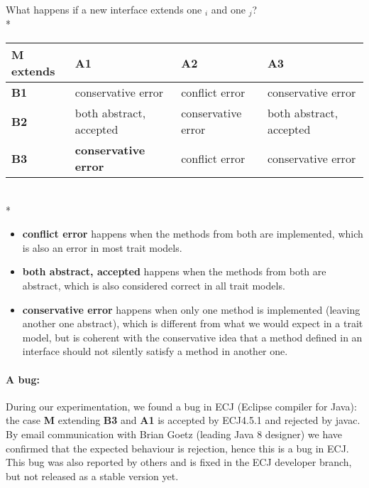 \noindent
What happens if a new interface \Q@M@ extends one \Q@A@${}_i$ and one
\Q@B@${}_j$?\\*
\noindent
\begin{tabular}{|l|l|l|l|}
\hline
\textbf{M extends} & \textbf{A1}                  & \textbf{A2} & \textbf{A3} \\ \hline
\textbf{B1}        & conservative error                        & conflict error      & conservative error       \\ \hline
\textbf{B2}        & both abstract, accepted                        & conservative error       & both abstract, accepted       \\ \hline
\textbf{B3}        & \textbf{conservative error} &conflict  error       & conservative error      \\ \hline
\end{tabular}
\\*
\begin{itemize}
\item \textbf{conflict error} happens when the methods from both are implemented, which is also an error in most trait models.
\item \textbf{both abstract, accepted} happens when the methods from both are abstract, which is also considered correct in all
  trait models.
\item \textbf{conservative error} happens when only one method is implemented
  (leaving another one abstract), which is different from what we would expect in
  a trait model, but is coherent with the conservative idea that a method
  defined in an interface should not silently satisfy a method in another one.
\end{itemize}

\paragraph{A bug:} During our experimentation, we found a bug in ECJ (Eclipse compiler for Java):
the case \textbf{M} extending \textbf{B3} and \textbf{A1} is accepted by
ECJ4.5.1 and rejected by javac.  By email communication with Brian Goetz
(leading Java 8 designer) we have confirmed that the expected behaviour is
rejection, hence this is a bug in ECJ. This bug was also reported by
  others and is fixed in the ECJ developer branch, but not released as a stable
  version yet.


